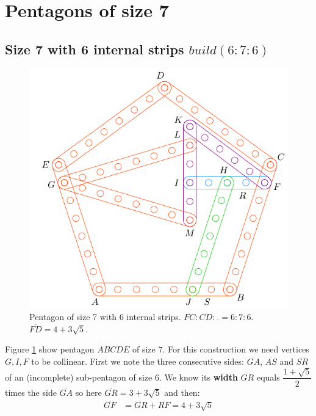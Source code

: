\documentclass[11pt]{article}
\begin{document}

\section{Pentagons of size 7}

\subsection{Size 7 with 6 internal strips $build(6:7:6)$}

\begin{figure}[H]
\centering
\includegraphics[scale=1]{7/penta7-6a}
\caption{Pentagon of size 7 with 6 internal strips. $\overline{FC} : \overline{CD} : \overline{} = 6:7:6$. $\overline{FD} = 4 + 3\sqrt5$.}
\label{fig:penta7-6a}
\end{figure}

Figure \ref{fig:penta7-6a} show pentagon $ABCDE$ of size $7$. For this construction we need vertices $G,I,F$ to be collinear. First we note the three consecutive sides: $\overline{GA}$, $\overline{AS}$ and $\overline{SR}$ of an (incomplete) sub-pentagon of size $6$. We know its \textbf{width} $\overline{GR}$ equals $\dfrac{1+\sqrt5}2$ times the side $\overline{GA}$ so here $\overline{GR} = 3 + 3\sqrt5$ and then:
\begin{align}
\overline{GF} &= \overline{GR} + \overline{RF} = 4 + 3\sqrt5
\end{align}
\end{document}
